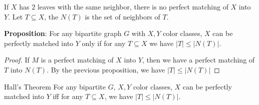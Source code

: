 \documentclass{report}
\begin{document}
If $X$ has $2$ leaves with the same neighbor, there is no perfect matching of $X$ into $Y$. Let $T \subseteq X$, the $N(T)$ is the set of neighbors of $T$. 

\textbf{Proposition}: For any bipartite graph $G$ with $X, Y$ color classes, $X$ can be perfectly matched into $Y$ only if for any $T \subseteq X$ we have $\lvert T \rvert \leq \lvert N(T) \rvert$.
    \begin{proof}
        If $M$ is a perfect matching of $X$ into $Y$, then we have a perfect matching of $T$ into $N(T)$. By the previous proposition, we have $\lvert T \rvert \leq \lvert N(T) \rvert$
    \end{proof}

\begin{theorem}{Hall's Theorem}
    For any bipartite $G$, $X, Y$ color classes, $X$ can be perfectly matched into $Y$ iff for any $T \subseteq X$, we have $\lvert T \rvert \leq \lvert N(T) \rvert$.
\end{theorem}
\end{document}
